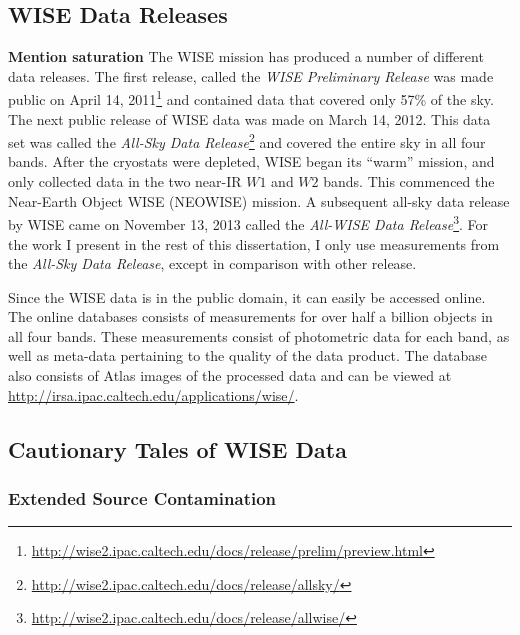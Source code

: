     \subsection{WISE Data Releases}
\textbf{Mention saturation}
    The WISE mission has produced a number of different data releases. The first release, called the \textit{WISE Preliminary Release} was made public on April 14, 2011\footnote{\url{http://wise2.ipac.caltech.edu/docs/release/prelim/preview.html}} and contained data that covered only 57\% of the sky. The next public release of WISE data was made on March 14, 2012. This data set was called the \textit{All-Sky Data Release}\footnote{\url{http://wise2.ipac.caltech.edu/docs/release/allsky/}} and covered the entire sky in all four bands. After the cryostats were depleted, WISE began its ``warm'' mission, and only collected data in the two near-IR $W1$ and $W2$ bands. This commenced the Near-Earth Object WISE (NEOWISE) mission. A subsequent all-sky data release by WISE came on November 13, 2013 called the \textit{All-WISE Data Release}\footnote{\url{http://wise2.ipac.caltech.edu/docs/release/allwise/}}. For the work I present in the rest of this dissertation, I only use measurements from the \textit{All-Sky Data Release}, except in comparison with other release. 
    
    Since the WISE data is in the public domain, it can easily be accessed online. The online databases consists of measurements for over half a billion objects in all four bands. These measurements consist of photometric data for each band, as well as meta-data pertaining to the quality of the data product. The database also consists of Atlas images of the processed data and can be viewed at \url{http://irsa.ipac.caltech.edu/applications/wise/}. 
    
    \subsection{Cautionary Tales of WISE Data}
    
        \subsubsection{Extended Source Contamination}
        
